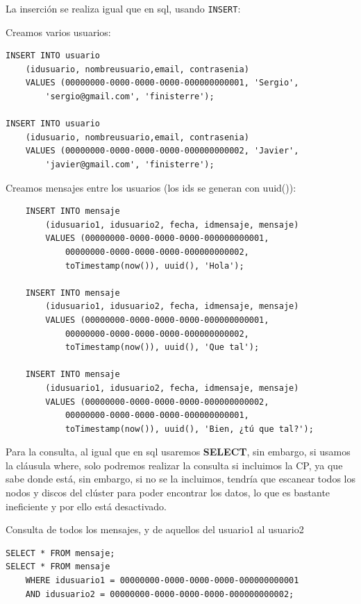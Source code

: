 La inserción se realiza igual que en sql, usando \texttt{INSERT}:

Creamos varios usuarios:
\begin{verbatim}
INSERT INTO usuario 
    (idusuario, nombreusuario,email, contrasenia) 
    VALUES (00000000-0000-0000-0000-000000000001, 'Sergio', 
        'sergio@gmail.com', 'finisterre');

INSERT INTO usuario 
    (idusuario, nombreusuario,email, contrasenia) 
    VALUES (00000000-0000-0000-0000-000000000002, 'Javier', 
        'javier@gmail.com', 'finisterre');
\end{verbatim}

Creamos mensajes entre los usuarios (los ids se generan con uuid()):
\begin{verbatim}
    INSERT INTO mensaje 
        (idusuario1, idusuario2, fecha, idmensaje, mensaje) 
        VALUES (00000000-0000-0000-0000-000000000001, 
            00000000-0000-0000-0000-000000000002, 
            toTimestamp(now()), uuid(), 'Hola');

    INSERT INTO mensaje 
        (idusuario1, idusuario2, fecha, idmensaje, mensaje) 
        VALUES (00000000-0000-0000-0000-000000000001, 
            00000000-0000-0000-0000-000000000002, 
            toTimestamp(now()), uuid(), 'Que tal');

    INSERT INTO mensaje 
        (idusuario1, idusuario2, fecha, idmensaje, mensaje) 
        VALUES (00000000-0000-0000-0000-000000000002, 
            00000000-0000-0000-0000-000000000001, 
            toTimestamp(now()), uuid(), 'Bien, ¿tú que tal?');
\end{verbatim}

Para la consulta, al igual que en sql usaremos \textbf{SELECT}, sin embargo, si usamos la cláusula where, solo podremos realizar 
la consulta si incluimos la CP, ya que sabe donde está, sin embargo, si no se la incluimos, tendría que escanear todos los nodos y discos
del clúster para poder encontrar los datos, lo que es bastante ineficiente y por ello está desactivado.

Consulta de todos los mensajes, y de aquellos del usuario1 al usuario2
\begin{verbatim}
SELECT * FROM mensaje;
SELECT * FROM mensaje
    WHERE idusuario1 = 00000000-0000-0000-0000-000000000001
    AND idusuario2 = 00000000-0000-0000-0000-000000000002;
\end{verbatim}

